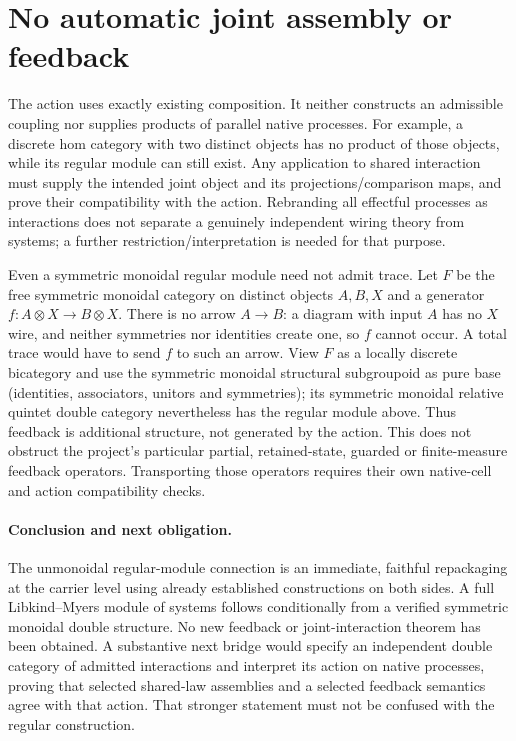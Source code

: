 \documentclass{article}
\begin{document}
\section{No automatic joint assembly or feedback}
The action uses exactly existing composition. It neither constructs an admissible coupling nor supplies products of parallel native processes. For example, a discrete hom category with two distinct objects has no product of those objects, while its regular module can still exist. Any application to shared interaction must supply the intended joint object and its projections/comparison maps, and prove their compatibility with the action. Rebranding all effectful processes as interactions does not separate a genuinely independent wiring theory from systems; a further restriction/interpretation is needed for that purpose.

Even a symmetric monoidal regular module need not admit trace. Let $F$ be the free symmetric monoidal category on distinct objects $A,B,X$ and a generator $f:A\otimes X\to B\otimes X$. There is no arrow $A\to B$: a diagram with input $A$ has no $X$ wire, and neither symmetries nor identities create one, so $f$ cannot occur. A total trace would have to send $f$ to such an arrow. View $F$ as a locally discrete bicategory and use the symmetric monoidal structural subgroupoid as pure base (identities, associators, unitors and symmetries); its symmetric monoidal relative quintet double category nevertheless has the regular module above. Thus feedback is additional structure, not generated by the action. This does not obstruct the project's particular partial, retained-state, guarded or finite-measure feedback operators. Transporting those operators requires their own native-cell and action compatibility checks.

\paragraph{Conclusion and next obligation.}
The unmonoidal regular-module connection is an immediate, faithful repackaging at the carrier level using already established constructions on both sides. A full Libkind--Myers module of systems follows conditionally from a verified symmetric monoidal double structure. No new feedback or joint-interaction theorem has been obtained. A substantive next bridge would specify an independent double category of admitted interactions and interpret its action on native processes, proving that selected shared-law assemblies and a selected feedback semantics agree with that action. That stronger statement must not be confused with the regular construction.
\end{document}
